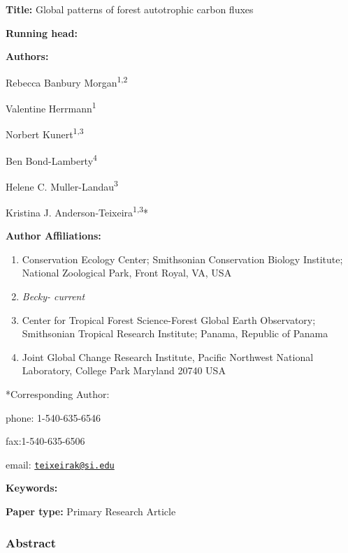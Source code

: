 \documentclass[]{article}
\title{}
\author{}
\date{}
\begin{document}
\textbf{Title:} Global patterns of forest autotrophic carbon fluxes

\textbf{Running head:}

\textbf{Authors:}

Rebecca Banbury Morgan\textsuperscript{1,2}

Valentine Herrmann\textsuperscript{1}

Norbert Kunert\textsuperscript{1,3}

Ben Bond-Lamberty\textsuperscript{4}

Helene C. Muller-Landau\textsuperscript{3}

Kristina J. Anderson-Teixeira\textsuperscript{1,3}*

\textbf{Author Affiliations:}

\begin{enumerate}
\def\labelenumi{\arabic{enumi}.}
\item
  Conservation Ecology Center; Smithsonian Conservation Biology
  Institute; National Zoological Park, Front Royal, VA, USA
\item
  \emph{Becky- current}
\item
  Center for Tropical Forest Science-Forest Global Earth Observatory;
  Smithsonian Tropical Research Institute; Panama, Republic of Panama
\item
  Joint Global Change Research Institute, Pacific Northwest National
  Laboratory, College Park Maryland 20740 USA
\end{enumerate}

*Corresponding Author:

phone: 1-540-635-6546

fax:1-540-635-6506

email: \href{mailto:teixeirak@si.edu}{\nolinkurl{teixeirak@si.edu}}

\textbf{Keywords:}

\textbf{Paper type:} Primary Research Article

\newpage

\subsubsection{Abstract}\label{abstract}
\end{document}
